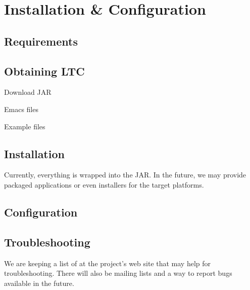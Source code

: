 \chapter{Installation \& Configuration} \label{ch:install}

\section{Requirements}

\section{Obtaining LTC}

Download JAR

Emacs files

Example files

\section{Installation}

Currently, everything is wrapped into the JAR.  In the future, we may provide packaged applications or even installers for the target platforms.

\section{Configuration}

\section{Troubleshooting}

We are keeping a list of  at the project's web site that may help for troubleshooting.  There will also be mailing lists and a way to report bugs available in the future.
